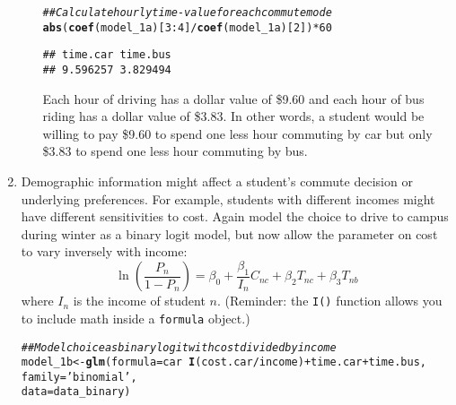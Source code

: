 \documentclass[11pt,letterpaper]{article}\usepackage[]{graphicx}\usepackage[]{xcolor}
\makeatletter
\newcommand{\hlnum}[1]{\textcolor[rgb]{0.686,0.059,0.569}{#1}}%
\newcommand{\hlstr}[1]{\textcolor[rgb]{0.192,0.494,0.8}{#1}}%
\newcommand{\hlcom}[1]{\textcolor[rgb]{0.678,0.584,0.686}{\textit{#1}}}%
\newcommand{\hlopt}[1]{\textcolor[rgb]{0,0,0}{#1}}%
\newcommand{\hlstd}[1]{\textcolor[rgb]{0.345,0.345,0.345}{#1}}%
\newcommand{\hlkwb}[1]{\textcolor[rgb]{0.69,0.353,0.396}{#1}}%
\newcommand{\hlkwc}[1]{\textcolor[rgb]{0.333,0.667,0.333}{#1}}%
\newcommand{\hlkwd}[1]{\textcolor[rgb]{0.737,0.353,0.396}{\textbf{#1}}}%
\newenvironment{kframe}{%
 \def\at@end@of@kframe{}%
 \ifinner\ifhmode%
  \def\at@end@of@kframe{\end{minipage}}%
  \begin{minipage}{\columnwidth}%
 \fi\fi%
 \def\FrameCommand##1{\hskip\@totalleftmargin \hskip-\fboxsep
 \colorbox{shadecolor}{##1}\hskip-\fboxsep
     \hskip-\linewidth \hskip-\@totalleftmargin \hskip\columnwidth}%
 \MakeFramed {\advance\hsize-\width
   \@totalleftmargin\z@ \linewidth\hsize
   \@setminipage}}%
 {\par\unskip\endMakeFramed%
 \at@end@of@kframe}
\newenvironment{knitrout}{}{} %
\makeatother
\begin{document}
\begin{enumerate}[label=\alph*., leftmargin=*]
\begin{enumerate}[label=\roman*.]
\begin{knitrout}
\color{fgcolor}\begin{kframe}
\begin{alltt}
\hlcom{## Calculate hourly time-value for each commute mode}
\hlkwd{abs}\hlstd{(}\hlkwd{coef}\hlstd{(model_1a)[}\hlnum{3}\hlopt{:}\hlnum{4}\hlstd{]} \hlopt{/} \hlkwd{coef}\hlstd{(model_1a)[}\hlnum{2}\hlstd{])} \hlopt{*} \hlnum{60}
\end{alltt}
\begin{verbatim}
## time.car time.bus 
## 9.596257 3.829494
\end{verbatim}
\end{kframe}
\end{knitrout}

		Each hour of driving has a dollar value of \$9.60 and each hour of bus riding has a dollar value of \$3.83. In other words, a student would be willing to pay \$9.60 to spend one less hour commuting by car but only \$3.83 to spend one less hour commuting by bus.
	\end{enumerate}

	\item Demographic information might affect a student's commute decision or underlying preferences. For example, students with different incomes might have different sensitivities to cost. Again model the choice to drive to campus during winter as a binary logit model, but now allow the parameter on cost to vary inversely with income:
	$$\ln \left( \frac{P_n}{1 - P_n} \right) = \beta_0 + \frac{\beta_1}{I_n} C_{nc} + \beta_2 T_{nc} + \beta_3 T_{nb}$$
	where $I_n$ is the income of student $n$. (Reminder: the \texttt{I()} function allows you to include math inside a \texttt{formula} object.)

\begin{knitrout}
\color{fgcolor}\begin{kframe}
\begin{alltt}
\hlcom{## Model choice as binary logit with cost divided by income}
\hlstd{model_1b} \hlkwb{<-} \hlkwd{glm}\hlstd{(}\hlkwc{formula} \hlstd{= car} \hlopt{~} \hlkwd{I}\hlstd{(cost.car} \hlopt{/} \hlstd{income)} \hlopt{+} \hlstd{time.car} \hlopt{+} \hlstd{time.bus,}
                \hlkwc{family} \hlstd{=} \hlstr{'binomial'}\hlstd{,}
                \hlkwc{data} \hlstd{= data_binary)}
\end{alltt}
\end{kframe}
\end{knitrout}


\end{enumerate}
\end{document}

